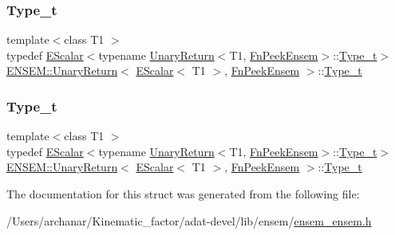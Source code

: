 \subsubsection{\texorpdfstring{Type\_t}{Type\_t}\hspace{0.1cm}{\footnotesize\ttfamily [2/3]}}
{\footnotesize\ttfamily template$<$class T1 $>$ \\
typedef \mbox{\hyperlink{classENSEM_1_1EScalar}{E\+Scalar}}$<$typename \mbox{\hyperlink{structENSEM_1_1UnaryReturn}{Unary\+Return}}$<$T1, \mbox{\hyperlink{structENSEM_1_1FnPeekEnsem}{Fn\+Peek\+Ensem}}$>$\+::\mbox{\hyperlink{structENSEM_1_1UnaryReturn_3_01EScalar_3_01T1_01_4_00_01FnPeekEnsem_01_4_a6043117f7e0aff65d845b3da0fb24d01}{Type\+\_\+t}}$>$ \mbox{\hyperlink{structENSEM_1_1UnaryReturn}{E\+N\+S\+E\+M\+::\+Unary\+Return}}$<$ \mbox{\hyperlink{classENSEM_1_1EScalar}{E\+Scalar}}$<$ T1 $>$, \mbox{\hyperlink{structENSEM_1_1FnPeekEnsem}{Fn\+Peek\+Ensem}} $>$\+::\mbox{\hyperlink{structENSEM_1_1UnaryReturn_3_01EScalar_3_01T1_01_4_00_01FnPeekEnsem_01_4_a6043117f7e0aff65d845b3da0fb24d01}{Type\+\_\+t}}}

\mbox{\label{structENSEM_1_1UnaryReturn_3_01EScalar_3_01T1_01_4_00_01FnPeekEnsem_01_4_a6043117f7e0aff65d845b3da0fb24d01}} 
\subsubsection{\texorpdfstring{Type\_t}{Type\_t}\hspace{0.1cm}{\footnotesize\ttfamily [3/3]}}
{\footnotesize\ttfamily template$<$class T1 $>$ \\
typedef \mbox{\hyperlink{classENSEM_1_1EScalar}{E\+Scalar}}$<$typename \mbox{\hyperlink{structENSEM_1_1UnaryReturn}{Unary\+Return}}$<$T1, \mbox{\hyperlink{structENSEM_1_1FnPeekEnsem}{Fn\+Peek\+Ensem}}$>$\+::\mbox{\hyperlink{structENSEM_1_1UnaryReturn_3_01EScalar_3_01T1_01_4_00_01FnPeekEnsem_01_4_a6043117f7e0aff65d845b3da0fb24d01}{Type\+\_\+t}}$>$ \mbox{\hyperlink{structENSEM_1_1UnaryReturn}{E\+N\+S\+E\+M\+::\+Unary\+Return}}$<$ \mbox{\hyperlink{classENSEM_1_1EScalar}{E\+Scalar}}$<$ T1 $>$, \mbox{\hyperlink{structENSEM_1_1FnPeekEnsem}{Fn\+Peek\+Ensem}} $>$\+::\mbox{\hyperlink{structENSEM_1_1UnaryReturn_3_01EScalar_3_01T1_01_4_00_01FnPeekEnsem_01_4_a6043117f7e0aff65d845b3da0fb24d01}{Type\+\_\+t}}}



The documentation for this struct was generated from the following file\+:\begin{DoxyCompactItemize}
\item 
/\+Users/archanar/\+Kinematic\+\_\+factor/adat-\/devel/lib/ensem/\mbox{\hyperlink{adat-devel_2lib_2ensem_2ensem__ensem_8h}{ensem\+\_\+ensem.\+h}}\end{DoxyCompactItemize}
